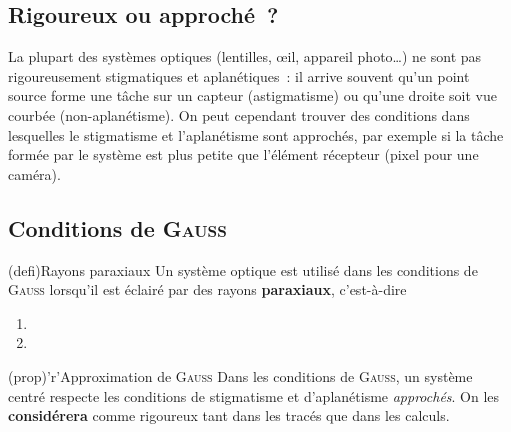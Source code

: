 \documentclass[../../main/main.tex]{subfiles}
\begin{document}
\subsection{Rigoureux ou approché~?}

La plupart des systèmes optiques (lentilles, œil, appareil photo…) ne sont pas
rigoureusement stigmatiques et aplanétiques~: il arrive souvent qu'un point
source forme une tâche sur un capteur (astigmatisme) ou qu'une droite soit vue
courbée (non-aplanétisme). On peut cependant trouver des conditions
dans lesquelles le stigmatisme et l'aplanétisme sont approchés, par exemple si
la tâche formée par le système est plus petite que l'élément récepteur (pixel
pour une caméra).

\subsection{Conditions de \textsc{Gauss}}

\begin{tcbraster}[raster columns=2, raster equal height=rows]
	\begin{tcb}[label=def:gausscond](defi){Rayons paraxiaux}
		Un système optique est utilisé dans les conditions de \textsc{Gauss} lorsqu'il
		est éclairé par des rayons \textbf{paraxiaux}, c'est-à-dire
		\begin{enumerate}
			\item {}
			\item {}
		\end{enumerate}
	\end{tcb}
	\begin{tcb}[label=prop:gaussprop](prop)'r'{Approximation de \textsc{Gauss}}
		Dans les conditions de \textsc{Gauss}, un système centré respecte les
		conditions de stigmatisme et d'aplanétisme \textit{approchés}. On les
		\textbf{considérera} comme rigoureux tant dans les tracés que dans les
		calculs.
	\end{tcb}
\end{tcbraster}
\end{document}
